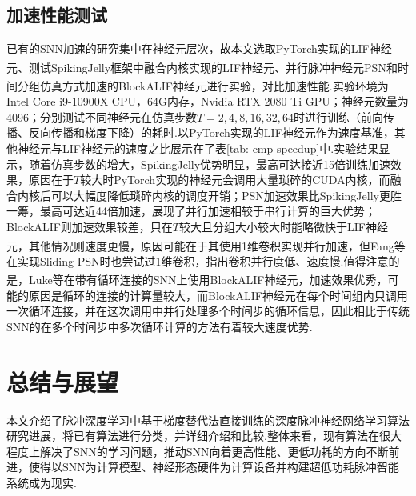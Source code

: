 \documentclass[10.5pt,compsoc,UTF8]{CjC}
\theoremstyle{mystyle}
\newcommand{\upcite}[1]{\textsuperscript{\cite{#1}}}
\begin{document}
\begin{multicols}{1}
\subsection{加速性能测试}
已有的SNN加速的研究集中在神经元层次，故本文选取PyTorch实现的LIF神经元、测试SpikingJelly框架中融合内核实现的LIF神经元\upcite{doi:10.1126/sciadv.adi1480}、并行脉冲神经元PSN\upcite{fang2023parallel}和时间分组仿真方式加速的BlockALIF神经元\upcite{NEURIPS2023_b9f253c2}进行实验，对比加速性能.实验环境为Intel Core i9-10900X CPU，64G内存，Nvidia RTX 2080 Ti GPU；神经元数量为4096；分别测试不同神经元在仿真步数$T=2,4,8,16,32,64$时进行训练（前向传播、反向传播和梯度下降）的耗时.以PyTorch实现的LIF神经元作为速度基准，其他神经元与LIF神经元的速度之比展示在了表\ref{tab: cmp speedup}中.实验结果显示，随着仿真步数的增大，SpikingJelly优势明显，最高可达接近15倍训练加速效果，原因在于$T$较大时PyTorch实现的神经元会调用大量琐碎的CUDA内核，而融合内核后可以大幅度降低琐碎内核的调度开销；PSN加速效果比SpikingJelly更胜一筹，最高可达近44倍加速，展现了并行加速相较于串行计算的巨大优势；BlockALIF则加速效果较差，只在$T$较大且分组大小较大时能略微快于LIF神经元，其他情况则速度更慢，原因可能在于其使用1维卷积实现并行加速，但Fang等\upcite{fang2023parallel}在实现Sliding PSN时也尝试过1维卷积，指出卷积并行度低、速度慢.值得注意的是，Luke等\upcite{NEURIPS2023_b9f253c2}在带有循环连接的SNN上使用BlockALIF神经元，加速效果优秀，可能的原因是循环的连接的计算量较大，而BlockALIF神经元在每个时间组内只调用一次循环连接，并在这次调用中并行处理多个时间步的循环信息，因此相比于传统SNN的在多个时间步中多次循环计算的方法有着较大速度优势.

\section{总结与展望}
本文介绍了脉冲深度学习中基于梯度替代法直接训练的深度脉冲神经网络学习算法研究进展，将已有算法进行分类，并详细介绍和比较.整体来看，现有算法在很大程度上解决了SNN的学习问题，推动SNN向着更高性能、更低功耗的方向不断前进，使得以SNN为计算模型、神经形态硬件为计算设备并构建超低功耗脉冲智能系统成为现实.



\end{multicols}
\end{document}

